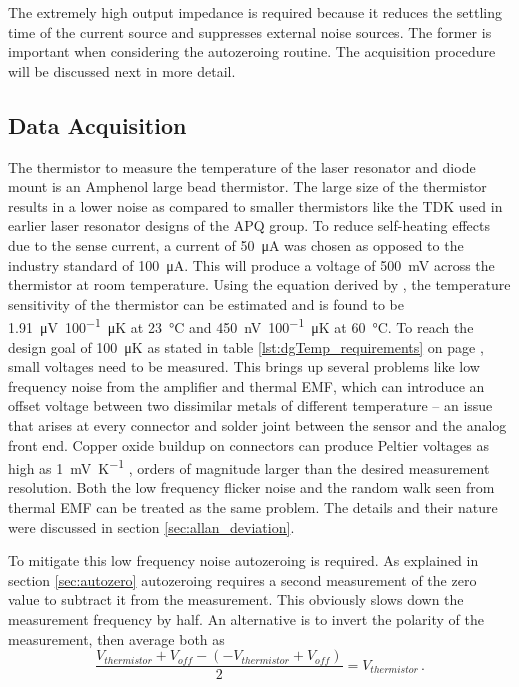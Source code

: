 The extremely high output impedance is required because it reduces the settling time of the current source and suppresses external noise sources. The former is important when considering the autozeroing routine. The acquisition procedure will be discussed next in more detail.

\subsection{Data Acquisition}
The thermistor to measure the temperature of the laser resonator and diode mount is an Amphenol  \cite{datasheet_amphenol_thermistor} large bead thermistor. The large size of the thermistor results in a lower noise as compared to smaller thermistors like the TDK  used in earlier laser resonator designs \cite{thermistor_noise} of the APQ group. To reduce self-heating effects due to the sense current, a current of \qty{50}{\uA} was chosen as opposed to the industry standard of \qty{100}{\uA}. This will produce a voltage of \qty{500}{\mV} across the thermistor at room temperature. Using the equation derived by \citeauthor{steinhart-hart} \cite{steinhart-hart}, the temperature sensitivity of the thermistor can be estimated and is found to be \qty{1.91}{\uV \per 100 \micro\K} at \qty{23}{\celsius} and \qty{450}{\nV \per 100 \micro\K} at \qty{60}{\celsius}. To reach the design goal of \qty{100}{\micro \K} as stated in table \ref{lst:dgTemp_requirements} on page \pageref{lst:dgTemp_requirements}, small voltages need to be measured. This brings up several problems like low frequency noise from the amplifier and thermal EMF, which can introduce an offset voltage between two dissimilar metals of different temperature -- an issue that arises at every connector and solder joint between the sensor and the analog front end. Copper oxide buildup on connectors can produce Peltier voltages as high as \qty{1}{\mV \per \K} \cite{horowitz1989}, orders of magnitude larger than the desired measurement resolution. Both the low frequency flicker noise and the random walk seen from thermal EMF can be treated as the same problem. The details and their nature were discussed in section \ref{sec:allan_deviation}.

To mitigate this low frequency noise autozeroing is required. As explained in section \ref{sec:autozero} autozeroing requires a second measurement of the zero value to subtract it from the measurement. This obviously slows down the measurement frequency by half. An alternative is to invert the polarity of the measurement, then average both as
\begin{equation}
    \frac{V_{thermistor} + V_{off} - (-V_{thermistor} + V_{off})}{2} = V_{thermistor}\,. \label{eqn:dgTemp_autozeroing}
\end{equation}

